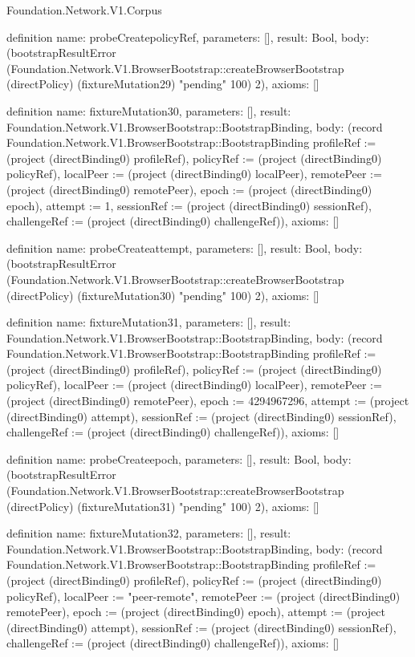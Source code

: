 \begin{lexlean}{Foundation.Network.V1.Corpus}
\begin{semanticmodule}
definition{
  name: probeCreatepolicyRef,
  parameters: [],
  result: Bool,
  body: (bootstrapResultError (Foundation.Network.V1.BrowserBootstrap::createBrowserBootstrap (directPolicy) (fixtureMutation29) "pending" 100) 2),
  axioms: []
}

definition{
  name: fixtureMutation30,
  parameters: [],
  result: Foundation.Network.V1.BrowserBootstrap::BootstrapBinding,
  body: (record Foundation.Network.V1.BrowserBootstrap::BootstrapBinding {profileRef := (project (directBinding0) profileRef), policyRef := (project (directBinding0) policyRef), localPeer := (project (directBinding0) localPeer), remotePeer := (project (directBinding0) remotePeer), epoch := (project (directBinding0) epoch), attempt := 1, sessionRef := (project (directBinding0) sessionRef), challengeRef := (project (directBinding0) challengeRef)}),
  axioms: []
}

definition{
  name: probeCreateattempt,
  parameters: [],
  result: Bool,
  body: (bootstrapResultError (Foundation.Network.V1.BrowserBootstrap::createBrowserBootstrap (directPolicy) (fixtureMutation30) "pending" 100) 2),
  axioms: []
}

definition{
  name: fixtureMutation31,
  parameters: [],
  result: Foundation.Network.V1.BrowserBootstrap::BootstrapBinding,
  body: (record Foundation.Network.V1.BrowserBootstrap::BootstrapBinding {profileRef := (project (directBinding0) profileRef), policyRef := (project (directBinding0) policyRef), localPeer := (project (directBinding0) localPeer), remotePeer := (project (directBinding0) remotePeer), epoch := 4294967296, attempt := (project (directBinding0) attempt), sessionRef := (project (directBinding0) sessionRef), challengeRef := (project (directBinding0) challengeRef)}),
  axioms: []
}

definition{
  name: probeCreateepoch,
  parameters: [],
  result: Bool,
  body: (bootstrapResultError (Foundation.Network.V1.BrowserBootstrap::createBrowserBootstrap (directPolicy) (fixtureMutation31) "pending" 100) 2),
  axioms: []
}

definition{
  name: fixtureMutation32,
  parameters: [],
  result: Foundation.Network.V1.BrowserBootstrap::BootstrapBinding,
  body: (record Foundation.Network.V1.BrowserBootstrap::BootstrapBinding {profileRef := (project (directBinding0) profileRef), policyRef := (project (directBinding0) policyRef), localPeer := "peer-remote", remotePeer := (project (directBinding0) remotePeer), epoch := (project (directBinding0) epoch), attempt := (project (directBinding0) attempt), sessionRef := (project (directBinding0) sessionRef), challengeRef := (project (directBinding0) challengeRef)}),
  axioms: []
}


\end{semanticmodule}
\end{lexlean}

